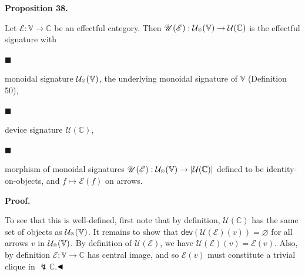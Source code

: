  
\par\medskip\noindent\textbf{Proposition 38.}\par
 
 
Let $\mathscr{E}:\mathbb{V}\to\mathbb{C}$ be an effectful category. Then $\mathscr{U}(\mathscr{E}):\mathcal{U}_{\mathbin{\raisebox{1.25pt}{$\scriptscriptstyle\otimes$}}}(\mathbb{V})\to\mathcal{U}(\mathbb{C})$ is the effectful signature with\par
  
\par\noindent  $\blacksquare$ 
 
monoidal signature $\mathcal{U}_{\mathbin{\raisebox{1.25pt}{$\scriptscriptstyle\otimes$}}}(\mathbb{V})$, the underlying monoidal signature of $\mathbb{V}$ (Definition 50),\par
 
 
 
\par\noindent  $\blacksquare$ 
 
device signature $\mathcal{U}(\mathbb{C})$,\par
 
 
 
\par\noindent  $\blacksquare$ 
 
morphism of monoidal signatures $\mathscr{U}(\mathscr{E}):\mathcal{U}_{\mathbin{\raisebox{1.25pt}{$\scriptscriptstyle\otimes$}}}(\mathbb{V})\to|\mathcal{U}(\mathbb{C})|$ defined to be identity-on-objects, and $f\mapsto\mathscr{E}(f)$ on arrows.\par
 
 
  
 
 
 
 
\par\medskip\noindent\textbf{Proof.}\par
 
 
To see that this is well-defined, first note that by definition, $\mathcal{U}(\mathbb{C})$ has the same set of objects as $\mathcal{U}_{\mathbin{\raisebox{1.25pt}{$\scriptscriptstyle\otimes$}}}(\mathbb{V})$. It remains to show that $\mathsf{dev}(\mathscr{U}(\mathscr{E})(v))=\varnothing$ for all arrows $v$ in $\mathcal{U}_{\mathbin{\raisebox{1.25pt}{$\scriptscriptstyle\otimes$}}}(\mathbb{V})$. By definition of $\mathscr{U}(\mathscr{E})$, we have $\mathscr{U}(\mathscr{E})(v)=\mathscr{E}(v)$. Also, by definition $\mathscr{E}:\mathbb{V}\to\mathbb{C}$ has central image, and so $\mathscr{E}(v)$ must constitute a trivial clique in ${\lightning}\mathbb{C}$.$\hfill\blacktriangleleft$\par
 
